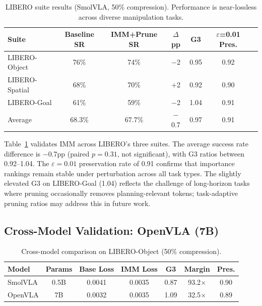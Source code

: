 \documentclass[conference]{corl_2026}
\newcommand{\ours}{IMM}
\begin{document}
\begin{table}[t]
\centering
\caption{LIBERO suite results (SmolVLA, 50\% compression). Performance is near-lossless across diverse manipulation tasks.}
\label{tab:libero}
\small
\begin{tabular}{@{}lcccccc@{}}
\toprule
Suite & Baseline SR & IMM+Prune SR & $\Delta$pp & G3 & $\varepsilon$=0.01 Pres. \\
\midrule
LIBERO-Object & 76\% & 74\% & $-$2 & 0.95 & 0.92 \\
LIBERO-Spatial & 68\% & 70\% & $+$2 & 0.92 & 0.90 \\
LIBERO-Goal & 61\% & 59\% & $-$2 & 1.04 & 0.91 \\
\midrule
Average & 68.3\% & 67.7\% & $-$0.7 & 0.97 & 0.91 \\
\bottomrule
\end{tabular}
\end{table}

Table~\ref{tab:libero} validates \ours{} across LIBERO's three suites. The average success rate difference is $-$0.7pp (paired $p=0.31$, not significant), with G3 ratios between 0.92--1.04. The $\varepsilon=0.01$ preservation rate of 0.91 confirms that importance rankings remain stable under perturbation across all task types. The slightly elevated G3 on LIBERO-Goal (1.04) reflects the challenge of long-horizon tasks where pruning occasionally removes planning-relevant tokens; task-adaptive pruning ratios may address this in future work.

\subsection{Cross-Model Validation: OpenVLA (7B)}
\label{sec:openvla}

\begin{table}[t]
\centering
\caption{Cross-model comparison on LIBERO-Object (50\% compression).}
\label{tab:cross_model}
\small
\begin{tabular}{@{}lcccccc@{}}
\toprule
Model & Params & Base Loss & IMM Loss & G3 & Margin & Pres. \\
\midrule
SmolVLA & 0.5B & 0.0041 & 0.0035 & 0.87 & 93.2$\times$ & 0.90 \\
OpenVLA & 7B & 0.0032 & 0.0035 & 1.09 & 32.5$\times$ & 0.89 \\
\bottomrule
\end{tabular}
\end{table}
\end{document}
